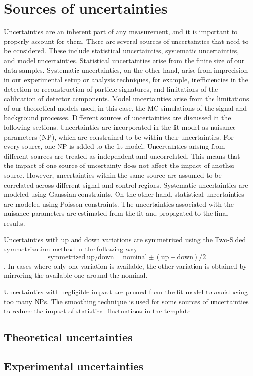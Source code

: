 \section{Sources of uncertainties}
\label{sec:sources-of-uncertainties}
Uncertainties are an inherent part of any measurement, and it is important to properly account for them. There are several sources of uncertainties that need to be considered. These include statistical uncertainties, systematic uncertainties, and model uncertainties. Statistical uncertainties arise from the finite size of our data samples. Systematic uncertainties, on the other hand, arise from imprecision in our experimental setup or analysis techniques, for example, inefficiencies in the detection or reconstruction of particle signatures, and limitations of the calibration of detector components. Model uncertainties arise from the limitations of our theoretical models used, in this case, the MC simulations of the signal and background processes. Different sources of uncertainties are discussed in the following sections. Uncertainties are incorporated in the fit model as nuisance parameters (NP), which are constrained to be within their uncertainties. For every source, one NP is added to the fit model. Uncertainties arising from different sources are treated as independent and uncorrelated. This means that the impact of one source of uncertainty does not affect the impact of another source. However, uncertainties within the same source are assumed to be correlated across different signal and control regions. Systematic uncertainties are modeled using Gaussian constraints. On the other hand, statistical uncertainties are modeled using Poisson constraints. The uncertainties associated with the nuisance parameters are estimated from the fit and propagated to the final results.

Uncertainties with up and down variations are symmetrized using the Two-Sided symmetrization method in the following way $$ \mathrm{symmetrized \ up/down} = \mathrm{nominal} \pm (\mathrm{up - down})/2 $$. In cases where only one variation is available, the other variation is obtained by mirroring the available one around the nominal. 

Uncertainties with negligible impact are pruned from the fit model to avoid using too many NPs. The smoothing technique is used for some sources of uncertainties to reduce the impact of statistical fluctuations in the template.

\subsection{Theoretical uncertainties}
\label{sec:theoretical_uncertainties}

\subsection{Experimental uncertainties}
\label{sec:experimental_uncertainties}

